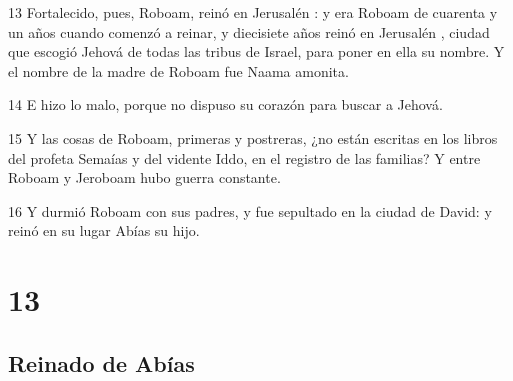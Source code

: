 \par 13 Fortalecido, pues, Roboam, reinó en Jerusalén : y era Roboam de cuarenta y un años cuando comenzó a reinar, y diecisiete años reinó en Jerusalén , ciudad que escogió Jehová de todas las tribus de Israel, para poner en ella su nombre. Y el nombre de la  madre de Roboam fue Naama amonita.
\par 14 E hizo lo malo, porque no dispuso su corazón para buscar a Jehová.
\par 15 Y las cosas de Roboam, primeras y postreras, ¿no están escritas en los libros del profeta Semaías y del vidente Iddo, en el registro de las familias? Y entre Roboam y Jeroboam hubo guerra constante. 
\par 16 Y durmió Roboam con sus padres, y fue sepultado en la ciudad de David: y reinó en su lugar Abías su hijo.

\chapter{13}

\section*{Reinado de Abías}

